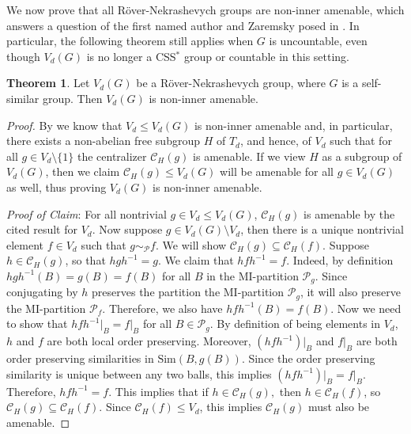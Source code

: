 \documentclass[12pt]{amsart}
\numberwithin{equation}{subsection}
\theoremstyle{definition}
\newtheorem{theorem}{Theorem}[section]
\theoremstyle{definition}
\theoremstyle{remark}
\begin{document}
We now prove that all R\"over-Nekrashevych groups are non-inner amenable, which answers a question of the first named author and Zaremsky posed in \cite{bashwinger2022non}. In particular, the following theorem still applies when $G$ is uncountable, even though $V_d(G)$ is no longer a CSS$^*$ group or countable in this setting.

\begin{theorem}\label{thm:RNnoninneramean}
    Let $V_d(G)$ be a R\"over-Nekrashevych group, where $G$ is a self-similar group. Then $V_d(G)$ is non-inner amenable. 
\end{theorem}

\begin{proof}
    By \cite{bashwinger2022non} we know that $V_d \leq V_d(G)$ is non-inner amenable and, in particular, there exists a non-abelian free subgroup $H$ of $T_d$, and hence, of $V_d$ such that for all $g \in V_d \setminus \{1\}$ the centralizer $\mathcal{C}_H(g)$ is amenable. If we view $H$ as a subgroup of $V_d(G)$, then we claim $\mathcal{C}_H(g) \leq V_d(G)$ will be amenable for all $g \in V_d(G)$ as well, thus proving $V_d(G)$ is non-inner amenable. 
    
    \emph{Proof of Claim}: For all nontrivial $g \in V_d \leq V_d(G)$, $\mathcal{C}_H(g)$ is amenable by the cited result for $V_d$. Now suppose $g \in V_d(G) \setminus V_d$, then there is a unique nontrivial element $f \in V_d$ such that $g \sim_\mathcal P f$. We will show $\mathcal{C}_H(g) \subseteq \mathcal{C}_H(f)$. Suppose $h \in \mathcal{C}_H(g)$, so that $hgh^{-1}=g$. We claim that $hfh^{-1}=f$. Indeed, by definition $hgh^{-1}(B)=g(B) = f(B)$ for all $B$ in the MI-partition $\mathcal P_g$. Since conjugating by $h$ preserves the partition the MI-partition $\mathcal P_g$, it will also preserve the MI-partition $\mathcal P_f$. Therefore, we also have $hfh^{-1}(B) = f(B)$. Now we need to show that $hfh^{-1}\vert_B = f\vert_B$ for all $B \in \mathcal P_g$.  By definition of being elements in $V_d$, $h$ and $f$ are both local order preserving. Moreover, $(hfh^{-1})\vert_B$ and $f\vert_B$ are both order preserving similarities in $\text{Sim}(B, g(B))$. Since the order preserving similarity is unique between any two balls, this implies $(hfh^{-1})\vert_B = f\vert_B$. Therefore, $hfh^{-1} = f$. This implies that if $h \in \mathcal{C}_H(g),$ then $h \in \mathcal{C}_H(f)$, so $\mathcal{C}_H(g) \subseteq \mathcal{C}_H(f)$. Since $\mathcal{C}_H(f) \leq V_d$, this implies $\mathcal{C}_H(g)$ must also be amenable. 
\end{proof}
\end{document}
